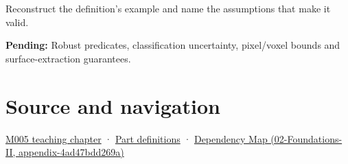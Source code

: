 Reconstruct the definition's example and name the assumptions that make it valid.

\textbf{Pending:} Robust predicates, classification uncertainty, pixel/voxel bounds and surface-extraction guarantees.

\section{Source and navigation}\label{appendix-c80db39080be-source-and-navigation}

\href{Continuous\%20Notes/Computing\%20Foundations\%20-\%20From\%20Bits\%20to\%20C++\%20and\%20Systems\%20APIs\#When\%20arithmetic\%20meets\%20uncertainty}{M005 teaching chapter} · \hyperref[appendix-fd090d982a15-m005---parts-77-88]{Part definitions} · \href{../02-Foundations-II/main.pdf\#nameddest=appendix-4ad47bdd269a}{Dependency Map (02-Foundations-II, appendix-4ad47bdd269a)}
